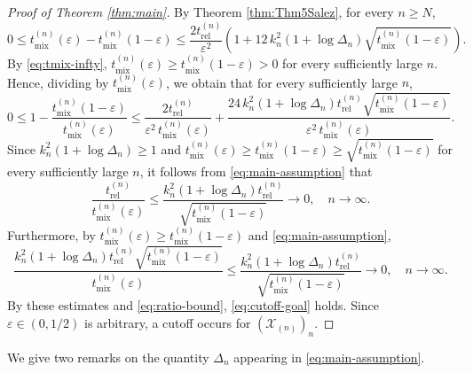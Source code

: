 \documentclass[a4paper, reqno, 11pt]{amsart}
\theoremstyle{definition}
\begin{document}
\begin{proof}[Proof of Theorem \ref{thm:main}]
By Theorem \ref{thm:Thm5Salez}, for every $n \ge N$,
\[ 0 \le t_{\mathrm{mix}}^{(n)}(\varepsilon) - t_{\mathrm{mix}}^{(n)}(1-\varepsilon) \le \frac{2t_{\mathrm{rel}}^{(n)}}{\varepsilon^{2}} \left(1 + 12\,k_n^{2}\left(1+\log \Delta_n\right)\sqrt{t_{\mathrm{mix}}^{(n)}(1-\varepsilon)}\right). \]
By \eqref{eq:tmix-infty}, $t_{\mathrm{mix}}^{(n)}(\varepsilon) \ge t_{\mathrm{mix}}^{(n)}(1-\varepsilon) > 0$ for every sufficiently large $n$.
Hence, dividing by $t_{\mathrm{mix}}^{(n)}(\varepsilon)$, we obtain that for every sufficiently large $n$,
\begin{equation}\label{eq:ratio-bound}
0 \le 1 - \frac{t_{\mathrm{mix}}^{(n)}(1-\varepsilon)}{t_{\mathrm{mix}}^{(n)}(\varepsilon)}
\le \frac{2t_{\mathrm{rel}}^{(n)}}{\varepsilon^{2}\,t_{\mathrm{mix}}^{(n)}(\varepsilon)}
+ \frac{24\,k_n^{2}\left(1+\log \Delta_n\right) t_{\mathrm{rel}}^{(n)} \sqrt{t_{\mathrm{mix}}^{(n)}(1-\varepsilon)}}{\varepsilon^{2}\,t_{\mathrm{mix}}^{(n)}(\varepsilon)}.
\end{equation}
Since $k_n^{2}\left(1+\log \Delta_n\right) \ge 1$ and
$t_{\mathrm{mix}}^{(n)}(\varepsilon) \ge t_{\mathrm{mix}}^{(n)}(1-\varepsilon) \ge \sqrt{t_{\mathrm{mix}}^{(n)}(1-\varepsilon)}$ for every sufficiently large $n$, it follows from \eqref{eq:main-assumption} that
\[ \frac{t_{\mathrm{rel}}^{(n)}}{t_{\mathrm{mix}}^{(n)}(\varepsilon)} \le \frac{k_n^{2}\left(1+\log \Delta_n\right) t_{\mathrm{rel}}^{(n)}}{\sqrt{t_{\mathrm{mix}}^{(n)}(1-\varepsilon)}} \to 0, \quad n \to \infty. \]
Furthermore, by $t_{\mathrm{mix}}^{(n)}(\varepsilon) \ge t_{\mathrm{mix}}^{(n)}(1-\varepsilon)$ and \eqref{eq:main-assumption},
\[ \frac{k_n^{2}\left(1+\log \Delta_n\right) t_{\mathrm{rel}}^{(n)} \sqrt{t_{\mathrm{mix}}^{(n)}(1-\varepsilon)}}{t_{\mathrm{mix}}^{(n)}(\varepsilon)}
\le \frac{k_n^{2}\left(1+\log \Delta_n\right) t_{\mathrm{rel}}^{(n)}}{\sqrt{t_{\mathrm{mix}}^{(n)}(1-\varepsilon)}} \to 0, \quad n \to \infty. \]
By these estimates and \eqref{eq:ratio-bound}, \eqref{eq:cutoff-goal} holds.
Since $\varepsilon \in \left(0,1/2\right)$ is arbitrary, a cutoff occurs for $\left(\mathcal{X}_{(n)} \right)_n$.
\end{proof}

We give two remarks on the quantity $\Delta_n$ appearing in \eqref{eq:main-assumption}.
\end{document}
